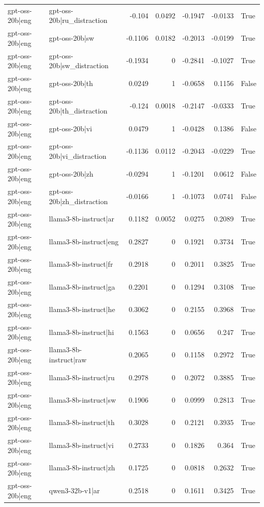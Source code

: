 \begin{table}
\begin{tabular}{l l r r r r l}
gpt-oss-20b|eng & gpt-oss-20b|ru_distraction & -0.104 & 0.0492 & -0.1947 & -0.0133 & True \\
gpt-oss-20b|eng & gpt-oss-20b|sw & -0.1106 & 0.0182 & -0.2013 & -0.0199 & True \\
gpt-oss-20b|eng & gpt-oss-20b|sw_distraction & -0.1934 & 0 & -0.2841 & -0.1027 & True \\
gpt-oss-20b|eng & gpt-oss-20b|th & 0.0249 & 1 & -0.0658 & 0.1156 & False \\
gpt-oss-20b|eng & gpt-oss-20b|th_distraction & -0.124 & 0.0018 & -0.2147 & -0.0333 & True \\
gpt-oss-20b|eng & gpt-oss-20b|vi & 0.0479 & 1 & -0.0428 & 0.1386 & False \\
gpt-oss-20b|eng & gpt-oss-20b|vi_distraction & -0.1136 & 0.0112 & -0.2043 & -0.0229 & True \\
gpt-oss-20b|eng & gpt-oss-20b|zh & -0.0294 & 1 & -0.1201 & 0.0612 & False \\
gpt-oss-20b|eng & gpt-oss-20b|zh_distraction & -0.0166 & 1 & -0.1073 & 0.0741 & False \\
gpt-oss-20b|eng & llama3-8b-instruct|ar & 0.1182 & 0.0052 & 0.0275 & 0.2089 & True \\
gpt-oss-20b|eng & llama3-8b-instruct|eng & 0.2827 & 0 & 0.1921 & 0.3734 & True \\
gpt-oss-20b|eng & llama3-8b-instruct|fr & 0.2918 & 0 & 0.2011 & 0.3825 & True \\
gpt-oss-20b|eng & llama3-8b-instruct|ga & 0.2201 & 0 & 0.1294 & 0.3108 & True \\
gpt-oss-20b|eng & llama3-8b-instruct|he & 0.3062 & 0 & 0.2155 & 0.3968 & True \\
gpt-oss-20b|eng & llama3-8b-instruct|hi & 0.1563 & 0 & 0.0656 & 0.247 & True \\
gpt-oss-20b|eng & llama3-8b-instruct|raw & 0.2065 & 0 & 0.1158 & 0.2972 & True \\
gpt-oss-20b|eng & llama3-8b-instruct|ru & 0.2978 & 0 & 0.2072 & 0.3885 & True \\
gpt-oss-20b|eng & llama3-8b-instruct|sw & 0.1906 & 0 & 0.0999 & 0.2813 & True \\
gpt-oss-20b|eng & llama3-8b-instruct|th & 0.3028 & 0 & 0.2121 & 0.3935 & True \\
gpt-oss-20b|eng & llama3-8b-instruct|vi & 0.2733 & 0 & 0.1826 & 0.364 & True \\
gpt-oss-20b|eng & llama3-8b-instruct|zh & 0.1725 & 0 & 0.0818 & 0.2632 & True \\
gpt-oss-20b|eng & qwen3-32b-v1|ar & 0.2518 & 0 & 0.1611 & 0.3425 & True \\

\end{tabular}
\end{table}
